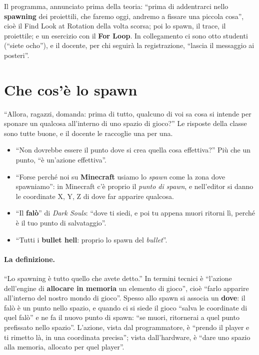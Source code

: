 Il programma, annunciato prima della teoria: ``prima di addentrarci nello
\textbf{spawning} dei proiettili, che faremo oggi, andremo a fissare una piccola cosa'',
cioè il Find Look at Rotation della volta scorsa; poi lo spawn, il trace, il proiettile;
e un esercizio con il \textbf{For Loop}. In collegamento ci sono otto studenti (``siete
ocho''), e il docente, per chi seguirà la registrazione, ``lascia il messaggio ai
posteri''.

\section{Che cos'è lo spawn}
\label{ue5:sec:spawn}

``Allora, ragazzi, domanda: prima di tutto, qualcuno di voi sa cosa si intende per
sponare un qualcosa all'interno di uno spazio di gioco?'' Le risposte della classe sono
tutte buone, e il docente le raccoglie una per una.
\begin{itemize}
  \item ``Non dovrebbe essere il punto dove si crea quella cosa effettiva?'' Più che un
        punto, ``è un'azione effettiva''.
  \item ``Forse perché noi su \textbf{Minecraft} usiamo lo \emph{spawn} come la zona
        dove spawniamo'': in Minecraft c'è proprio il \emph{punto di spawn}, e
        nell'editor si danno le coordinate X, Y, Z di dove far apparire qualcosa.
  \item ``Il \textbf{falò}'' di \emph{Dark Souls}: ``dove ti siedi, e poi tu appena
        muori ritorni lì, perché è il tuo punto di salvataggio''.
  \item ``Tutti i \textbf{bullet hell}: proprio lo spawn del \emph{bullet}''.
\end{itemize}

\paragraph{La definizione.} ``Lo spawning è tutto quello che avete detto.'' In termini
tecnici è ``l'azione dell'engine di \textbf{allocare in memoria} un elemento di gioco'',
cioè ``farlo apparire all'interno del nostro mondo di gioco''. Spesso allo spawn si
associa un \textbf{dove}: il falò è un punto nello spazio, e quando ci si siede il gioco
``salva le coordinate di quel falò'' e ne fa il nuovo punto di spawn: ``se muori,
ritornerai a quel punto prefissato nello spazio''. L'azione, vista dal programmatore, è
``prendo il player e ti rimetto là, in una coordinata precisa''; vista dall'hardware, è
``dare uno spazio alla memoria, allocato per quel player''.


